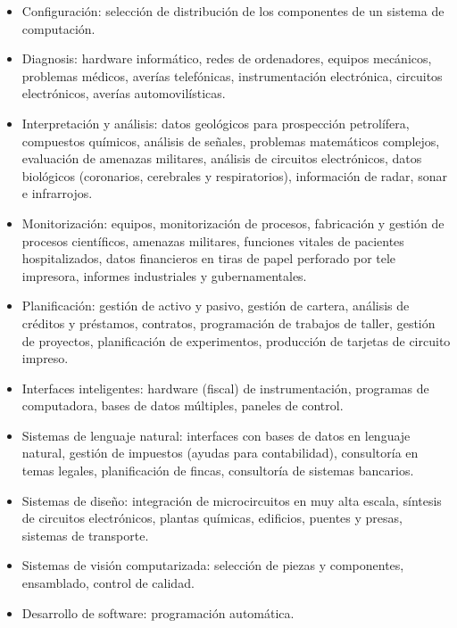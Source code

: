 \begin{itemize}
\item Configuraci\'on: selecci\'on de distribuci\'on de los componentes de un sistema de computaci\'on.
\item Diagnosis: hardware inform\'atico, redes de ordenadores, equipos mec\'anicos, problemas m\'edicos, aver\'ias telef\'onicas, instrumentaci\'on electr\'onica, circuitos electr\'onicos, aver\'ias automovil\'isticas.
\item Interpretaci\'on y an\'alisis: datos geol\'ogicos para prospecci\'on petrolífera, compuestos qu\'imicos, an\'alisis de se\~nales, problemas matem\'aticos complejos, evaluaci\'on de amenazas militares, an\'alisis de circuitos electr\'onicos, datos biol\'ogicos (coronarios, cerebrales y respiratorios), informaci\'on de radar, sonar e infrarrojos.
\item Monitorizaci\'on: equipos, monitorizaci\'on de procesos, fabricaci\'on y gesti\'on de procesos cient\'ificos, amenazas militares, funciones vitales de pacientes hospitalizados, datos financieros en tiras de papel perforado por tele impresora, informes industriales y gubernamentales.
\item Planificaci\'on: gesti\'on de activo y pasivo, gesti\'on de cartera, análisis de cr\'editos y pr\'estamos, contratos, programaci\'on de trabajos de taller, gesti\'on de proyectos, planificaci\'on de experimentos, producci\'on de tarjetas de circuito impreso.
\item Interfaces inteligentes: hardware (fiscal) de instrumentaci\'on, programas de computadora, bases de datos m\'ultiples, paneles de control.
\item Sistemas de lenguaje natural: interfaces con bases de datos en lenguaje natural, gesti\'on de impuestos (ayudas para contabilidad), consultoría en temas legales, planificaci\'on de fincas, consultor\'ia de sistemas bancarios.
\item Sistemas de dise\~no: integraci\'on de microcircuitos en muy alta escala, síntesis de circuitos electr\'onicos, plantas qu\'imicas, edificios, puentes y presas, sistemas de transporte.
\item Sistemas de visión computarizada: selecci\'on de piezas y componentes, ensamblado, control de calidad.
\item Desarrollo de software: programaci\'on autom\'atica.
\end{itemize}



